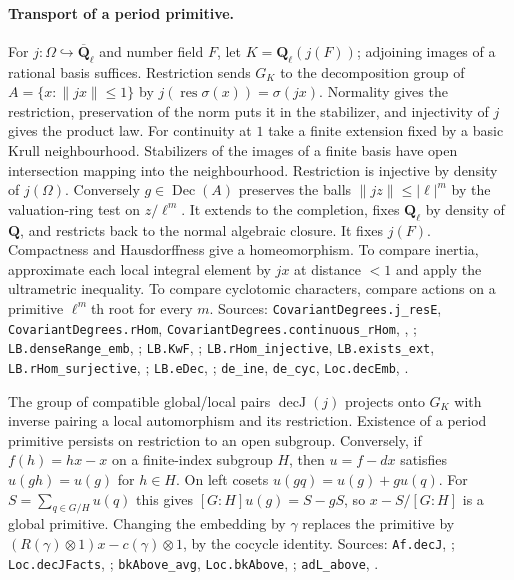\paragraph{Transport of a period primitive.}
For $j:\Omega\hookrightarrow\overline{\mathbf Q}_\ell$ and number field
$F$, let $K=\mathbf Q_\ell(j(F))$; adjoining images of a rational
basis suffices. Restriction sends $G_K$ to the decomposition group of
$A=\{x:\lVert jx\rVert\le1\}$ by
$j(\operatorname{res}\sigma(x))=\sigma(jx)$. Normality gives the
restriction, preservation of the norm puts it in the stabilizer, and
injectivity of $j$ gives the product law. For continuity at $1$ take
a finite extension fixed by a basic Krull neighbourhood. Stabilizers
of the images of a finite basis have open intersection mapping into the
neighbourhood. Restriction is injective by density of $j(\Omega)$.
Conversely $g\in\operatorname{Dec}(A)$ preserves the balls
$\lVert jz\rVert\le|\ell|^m$ by the valuation-ring test on $z/\ell^m$.
It extends to the completion, fixes $\mathbf Q_\ell$ by density of
$\mathbf Q$, and restricts back to the normal algebraic closure. It fixes
$j(F)$. Compactness and Hausdorffness give a homeomorphism. To compare
inertia, approximate each local integral element by $jx$ at distance
$<1$ and apply the ultrametric inequality. To compare cyclotomic
characters, compare actions on a primitive $\ell^m$th root for every $m$.
Sources: \nolinkurl{CovariantDegrees.j_resE},
\nolinkurl{CovariantDegrees.rHom}, \nolinkurl{CovariantDegrees.continuous_rHom},
,
;
\nolinkurl{LB.denseRange_emb}, ;
\nolinkurl{LB.KwF}, ;
\nolinkurl{LB.rHom_injective}, \nolinkurl{LB.exists_ext},
\nolinkurl{LB.rHom_surjective}, ;
\nolinkurl{LB.eDec}, ;
\nolinkurl{de_ine}, \nolinkurl{de_cyc}, \nolinkurl{Loc.decEmb},
.

The group of compatible global/local pairs $\operatorname{decJ}(j)$
projects onto $G_K$ with inverse pairing a local automorphism and its
restriction. Existence of a period primitive persists on restriction to
an open subgroup. Conversely, if $f(h)=hx-x$ on a finite-index subgroup
$H$, then $u=f-dx$ satisfies $u(gh)=u(g)$ for $h\in H$. On left
cosets $u(gq)=u(g)+gu(q)$. For $S=\sum_{q\in G/H}u(q)$ this gives
$[G:H]u(g)=S-gS$, so $x-S/[G:H]$ is a global primitive. Changing
the embedding by $\gamma$ replaces the primitive by
$(R(\gamma)\otimes1)x-c(\gamma)\otimes1$, by the cocycle identity.
Sources: \nolinkurl{Af.decJ}, ;
\nolinkurl{Loc.decJFacts}, ;
\nolinkurl{bkAbove_avg}, \nolinkurl{Loc.bkAbove}, ;
\nolinkurl{adL_above}, .

